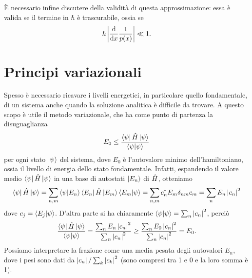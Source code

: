 È necessario infine discutere della validità di questa approssimazione: essa è valida se il termine in $\hbar$ è trascurabile, ossia se
\begin{equation}
	\hbar\left|{\frac{\textup{d} {}}{\textup{d} {x}}\frac1{p(x)}}\right|\ll 1.
	\label{eq:condizione-approssimazione-WKB}
\end{equation}

\section{Principi variazionali}
Spesso è necessario ricavare i livelli energetici, in particolare quello fondamentale, di un sistema anche quando la soluzione analitica è difficile da trovare.
A questo scopo è utile il metodo variazionale, che ha come punto di partenza la disuguaglianza
\begin{equation}
	E_0\le\frac{\left\langle{\psi}\right|\hat{H}\left|{\psi}\right\rangle}{\left\langle{\psi}\middle|{\psi}\right\rangle}
	\label{eq:principio-variazionale}
\end{equation}
per ogni stato $\left|{\psi}\right\rangle$ del sistema, dove $E_0$ è l'autovalore minimo dell'hamiltoniano, ossia il livello di energia dello stato fondamentale.
Infatti, espandendo il valore medio $\left\langle{\psi}\right|\hat{H}\left|{\psi}\right\rangle$ in una base di autostati $\left|{E_n}\right\rangle$ di $\hat{H}$, otteniamo
\begin{equation}
	\left\langle{\psi}\right|\hat{H}\left|{\psi}\right\rangle=\sum_{n,m}\left\langle{\psi}\middle|{E_n}\right\rangle\left\langle{E_n}\right|\hat{H}\left|{E_m}\right\rangle\left\langle{E_m}\middle|{\psi}\right\rangle=\sum_{n,m}c_n^*E_m\delta_{nm}c_m=\sum_nE_n\left|{c_n}\right|^2
\end{equation}
dove $c_j=\left\langle{E_j}\middle|{\psi}\right\rangle$.
D'altra parte si ha chiaramente $\left\langle{\psi}\middle|{\psi}\right\rangle=\sum_n\left|{c_n}\right|^2$, perciò
\begin{equation}
	\frac{\left\langle{\psi}\right|\hat{H}\left|{\psi}\right\rangle}{\left\langle{\psi}\middle|{\psi}\right\rangle}=\frac{\sum_nE_n\left|{c_n}\right|^2}{\sum_n\left|{c_n}\right|^2}\ge\frac{\sum_nE_0\left|{c_n}\right|^2}{\sum_n\left|{c_n}\right|^2}=E_0.
\end{equation}
Possiamo interpretare la frazione come una media pesata degli autovalori $E_n$, dove i pesi sono dati da $\left|{c_n}\right|/\sum_k\left|{c_k}\right|^2$ (sono compresi tra 1 e 0 e la loro somma è 1).

